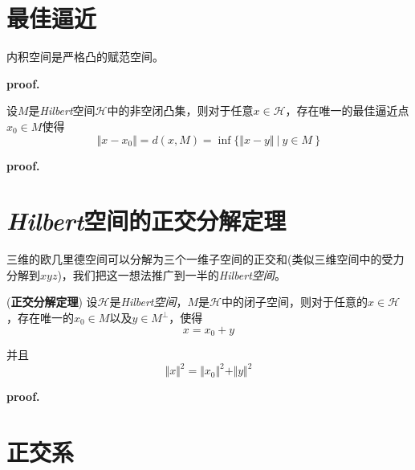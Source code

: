 \section{最佳逼近}

\begin{mdframed}
    \begin{theorem}
        内积空间是严格凸的赋范空间。
    \end{theorem}
\end{mdframed}
\textbf{proof.}

\begin{mdframed}
    \begin{theorem}
        设$M$是\textsl{Hilbert}空间$\mathcal{H}$中的非空闭凸集，则对于任意$x\in \mathcal{H}$，存在唯一的最佳逼近点$x_0\in M$使得
        \begin{equation}
            \Vert x-x_0\Vert = d(x,M)=\inf\{\Vert x-y\Vert\ |\ y\in M\ \}
        \end{equation}
    \end{theorem}
\end{mdframed}
\textbf{proof.}

\section{\textsl{Hilbert}空间的正交分解定理}

三维的欧几里德空间可以分解为三个一维子空间的正交和(类似三维空间中的受力分解到$xyz$)，我们把这一想法推广到一半的\textsl{Hilbert空间}。

\begin{mdframed}
    \begin{theorem}
        (\textbf{正交分解定理}) 设$\mathcal{H}$是\textsl{Hilbert空间}，$M$是$\mathcal{H}$中的闭子空间，则对于任意的$x\in \mathcal{H}$，存在唯一的$x_0\in M$以及$y\in M^\perp$，使得
        \begin{equation}
            x=x_0+y
        \end{equation}

        并且
        \begin{equation}
            \Vert x\Vert^2=\Vert x_0\Vert^2+\Vert y\Vert^2
        \end{equation}
    \end{theorem}
\end{mdframed}

\textbf{proof.}

\section{正交系}

